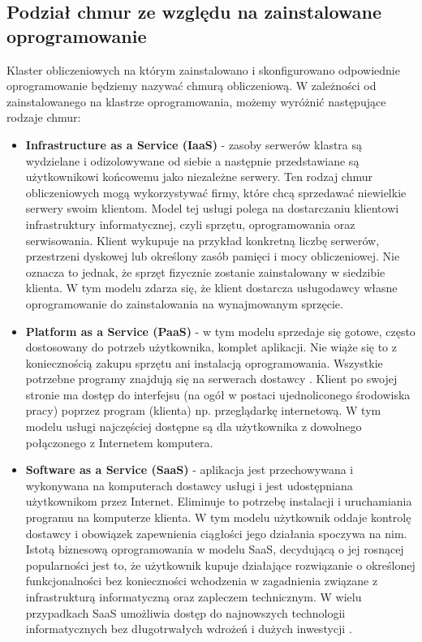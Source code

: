 \documentclass[10pt,a4paper,titlepage,twoside]{report}
\begin{document}
\subsection{Podział chmur ze względu na zainstalowane oprogramowanie}\indent \indent Klaster obliczeniowych na którym zainstalowano i skonfigurowano odpowiednie oprogramowanie będziemy nazywać chmurą obliczeniową. W zależności od zainstalowanego na klastrze oprogramowania, możemy wyróżnić następujące rodzaje chmur\cite{ad6}:
\begin{itemize}
	\item \textbf{Infrastructure as a Service (IaaS)} - zasoby serwerów klastra są wydzielane i odizolowywane od siebie a następnie przedstawiane są użytkownikowi końcowemu jako niezależne serwery. Ten rodzaj chmur obliczeniowych mogą wykorzystywać firmy, które chcą sprzedawać niewielkie serwery swoim klientom. Model tej usługi polega na dostarczaniu klientowi infrastruktury informatycznej, czyli sprzętu, oprogramowania oraz serwisowania. Klient wykupuje na przykład konkretną liczbę serwerów, przestrzeni dyskowej lub określony zasób pamięci i mocy obliczeniowej. Nie oznacza to jednak, że sprzęt fizycznie zostanie zainstalowany w siedzibie klienta\cite{ad7}. W tym modelu zdarza się, że klient dostarcza usługodawcy własne oprogramowanie do zainstalowania na wynajmowanym sprzęcie.
	\item \textbf{Platform as a Service (PaaS)} - w tym modelu sprzedaje się gotowe, często dostosowany do potrzeb użytkownika, komplet aplikacji. Nie wiąże się to z koniecznością zakupu sprzętu ani instalacją oprogramowania. Wszystkie potrzebne programy znajdują się na serwerach dostawcy \cite{ad9}. Klient po swojej stronie ma dostęp do interfejsu (na ogół w postaci ujednoliconego środowiska pracy) poprzez program (klienta) np. przeglądarkę internetową. W tym modelu usługi najczęściej dostępne są dla użytkownika z dowolnego połączonego z Internetem komputera.
	\item \textbf{Software as a Service (SaaS)} - aplikacja jest przechowywana i wykonywana na komputerach dostawcy usługi i jest udostępniana użytkownikom przez Internet. Eliminuje to potrzebę instalacji i uruchamiania programu na komputerze klienta. W tym modelu użytkownik oddaje kontrolę dostawcy i obowiązek zapewnienia ciągłości jego działania spoczywa na nim. Istotą biznesową oprogramowania w modelu SaaS, decydującą o jej rosnącej popularności jest to, że użytkownik kupuje działające rozwiązanie o określonej funkcjonalności bez konieczności wchodzenia w zagadnienia związane z infrastrukturą informatyczną oraz zapleczem technicznym. W wielu przypadkach SaaS umożliwia dostęp do najnowszych technologii informatycznych bez długotrwałych wdrożeń i dużych inwestycji \cite{ad8}.

\end{itemize}
\end{document}
